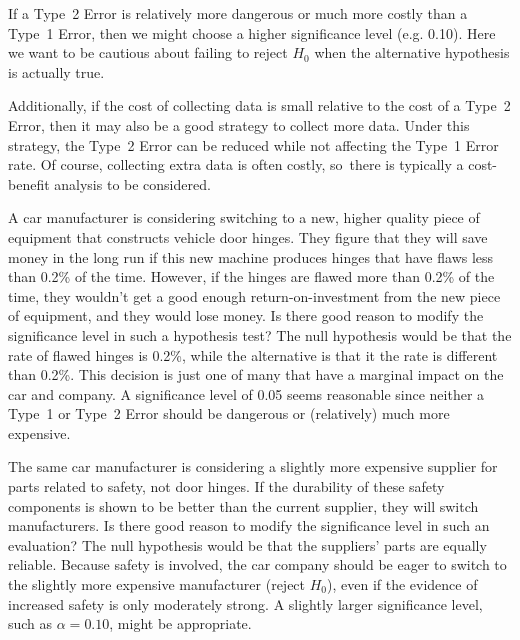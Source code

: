 If a Type~2 Error is relatively more dangerous or much more
costly than a Type~1 Error, then we might choose a higher
significance level (e.g. 0.10). Here we want to be cautious
about failing to reject $H_0$ when the alternative hypothesis
is actually true.

Additionally, if the cost of collecting data is small relative
to the cost of a Type~2 Error, then it may also be a good
strategy to collect more data.
Under this strategy, the Type~2 Error can be reduced
while not affecting the Type~1 Error rate.
Of course, collecting extra data is often costly,
so~there is typically a cost-benefit analysis to be considered.

\newcommand{\doorhingeflawrate}{0.2}

\begin{examplewrap}
\begin{nexample}{A car manufacturer is considering switching
    to a new, higher quality piece of equipment that constructs
    vehicle door hinges.
    They figure that they will save money in the long run
    if this new machine produces hinges
    that have flaws less than
    \doorhingeflawrate{}\% of the time.
    However, if the hinges are flawed more than
    \doorhingeflawrate{}\% of
    the time, they wouldn't get a good enough
    return-on-investment from the new piece of equipment,
    and they would lose money.
    Is there good reason to modify the significance level
    in such a hypothesis test?}
  The null hypothesis would be that the rate of flawed
  hinges is \doorhingeflawrate{}\%,
  while the alternative is that it the rate
  is different than \doorhingeflawrate{}\%.
  This decision is just one of many that have a marginal
  impact on the car and company.
  A significance level of 0.05 seems reasonable since
  neither a Type~1 or Type~2 Error should be dangerous
  or (relatively) much more expensive.
\end{nexample}
\end{examplewrap}

\begin{examplewrap}
\begin{nexample}{The same car manufacturer is considering
    a slightly more expensive supplier for parts related
    to safety, not door hinges.
    If the durability of these
    safety components is shown to be better than the
    current supplier, they will switch manufacturers.
    Is there good reason to modify the significance level
    in such an evaluation?}
  The null hypothesis would be that the suppliers' parts
  are equally reliable. Because safety is involved,
  the car company should be eager to switch to the slightly
  more expensive manufacturer (reject $H_0$), even if the
  evidence of increased safety is only moderately strong.
  A slightly larger significance level,
  such as $\alpha=0.10$, might be appropriate.
\end{nexample}
\end{examplewrap}

